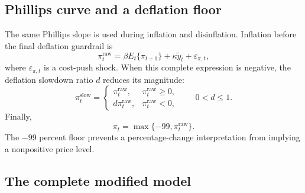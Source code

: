 \documentclass[11pt]{article}
\newcommand{\gap}{\widetilde y}
\begin{document}
\subsection{Phillips curve and a deflation floor}

The same Phillips slope is used during inflation and disinflation. Inflation
before the final deflation guardrail is
\begin{equation}
  \pi_t^{\mathrm{raw}}
  =\beta E_t\{\pi_{t+1}\}+\kappa\gap_t
  +\varepsilon_{\pi,t},
  \label{eq:raw-phillips}
\end{equation}
where $\varepsilon_{\pi,t}$ is a cost-push shock. When this complete expression
is negative, the deflation slowdown ratio $d$ reduces its magnitude:
\begin{equation}
  \pi_t^{\mathrm{slow}}=
  \begin{cases}
    \pi_t^{\mathrm{raw}}, & \pi_t^{\mathrm{raw}}\geq0,\\
    d\pi_t^{\mathrm{raw}}, & \pi_t^{\mathrm{raw}}<0,
  \end{cases}
  \qquad 0<d\leq1.
\end{equation}
Finally,
\begin{equation}
  \pi_t=\max\{-99,\pi_t^{\mathrm{raw}}\}.
  \label{eq:inflation-floor}
\end{equation}
The $-99$ percent floor prevents a percentage-change
interpretation from implying a nonpositive price level.

\subsection{The complete modified model}
\end{document}
